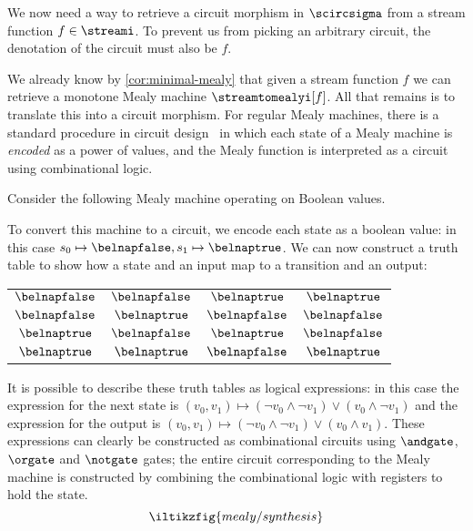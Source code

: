 \documentclass{lmcs}
\begin{document}
We now need a way to retrieve a circuit morphism in \(\scircsigma\) from a
stream function \(f \in \streami\).
To prevent us from picking an arbitrary circuit, the denotation of the circuit
must also be \(f\).

We already know by \autoref{cor:minimal-mealy} that given a stream function
\(f\) we can retrieve a monotone Mealy machine \(\streamtomealyi[f]\).
All that remains is to translate this into a circuit morphism.
For regular Mealy machines, there is a standard procedure in circuit
design~\cite{kohavi2009switching} in which each state of a Mealy machine is
\emph{encoded} as a power of values, and the Mealy function is interpreted as
a circuit using combinational logic.

\begin{exa}\label{ex:boolean-to-circuit}
    Consider the following Mealy machine operating on Boolean values.
    \begin{center}
        
    \end{center}
    \vspace{-\belowdisplayskip}
    To convert this machine to a circuit, we encode each state as a boolean
    value:
    in this case \(s_0 \mapsto \belnapfalse, s_1 \mapsto \belnaptrue\).
    We can now construct a truth table to show how a state and an input map to
    a transition and an output:
    \begin{center}
        \begin{tabular}{cc|cc}
            \(\belnapfalse\) & \(\belnapfalse\) & \(\belnaptrue\)  & \(\belnaptrue\)  \\
            \(\belnapfalse\) & \(\belnaptrue\)  & \(\belnapfalse\) & \(\belnapfalse\) \\
            \(\belnaptrue\)  & \(\belnapfalse\) & \(\belnaptrue\)  & \(\belnapfalse\) \\
            \(\belnaptrue\)  & \(\belnaptrue\)  & \(\belnapfalse\) & \(\belnaptrue\)  \\
        \end{tabular}
    \end{center}
    It is possible to describe these truth tables as logical expressions: in
    this case the expression for the next state is \(
    (v_0, v_1)
    \mapsto
    (\neg v_0 \land \neg v_1) \lor (v_0 \land \neg v_1)
    \) and the expression for the output is \(
    (v_0, v_1)
    \mapsto
    (\neg v_0 \land \neg v_1) \lor (v_0 \land v_1)
    \).
    These expressions can clearly be constructed as combinational circuits using
    \(\andgate\), \(\orgate\) and \(\notgate\) gates; the entire circuit
    corresponding to the Mealy machine is constructed by combining the
    combinational logic with registers to hold the state.
    \[\iltikzfig{mealy/synthesis}\]
\end{exa}
\end{document}
